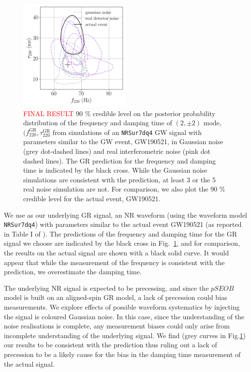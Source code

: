 \documentclass[twocolumn,prd,superscriptaddress,amsfonts,amssymb,amsmath,preprintnumbers]{revtex4-1}
\newcommand{\fgr}[1]{f ^{\text{GR}}_{\text{#1}}}
\newcommand{\taugr}[1]{\tau ^{\text{GR}}_{\text{#1}}}
\begin{document}
\begin{figure}
	\includegraphics[width=0.5\textwidth]{figures/S190521g_swinjs.png}
	\caption{\textcolor{red}{FINAL RESULT} 90 \% credible level on the posterior probability distribution of the frequency and damping time of $(2,\pm 2)$ mode, $(\fgr{220}, \taugr{220}$ from simulations of an \texttt{NRSur7dq4} GW signal with parameters similar to the GW event, GW190521, in Gaussian noise (grey dot-dashed lines) and real interferometric noise (pink dot dashed lines). The GR prediction for the frequency and damping time is indicated by the black cross. While the Gaussian noise simulations are consistent with the prediction, at least 3 or the 5 real noise simulation are not. For comparison, we also plot the 90 \% credible level for the actual event, GW190521.}
	\label{fig:21g_systematics}
\end{figure}

We use as our underlying GR signal, an NR waveform (using the waveform model \texttt{NRSur7dq4}) with parameters similar to the actual event GW190521 (as reported in Table I of \cite{Abbott:2020tfl}). The predictions of the frequency and damping time for the GR signal we choose are indicated by the black cross in Fig.~\ref{fig:21g_systematics}, and for comparison, the results on the actual signal are shown with a black solid curve. It would appear that while the measurement of the frequency is consistent with the prediction, we overestimate the damping time. 

The underlying NR signal is expected to be precessing, and since the $pSEOB$ model is built on an aligned-spin GR model, a lack of precession could bias measurements. We explore effects of possible waveform systematics by injecting the signal is coloured Gaussian noise. In this case, since the understanding of the noise realisations is complete, any measurement biases could only arise from incomplete understanding of the underlying signal. We find (grey curves in Fig.\ref{fig:21g_systematics}) our results to be consistent with the prediction thus ruling out a lack of precession to be a likely cause for the bias in the damping time measurement of the actual signal.
\end{document}
